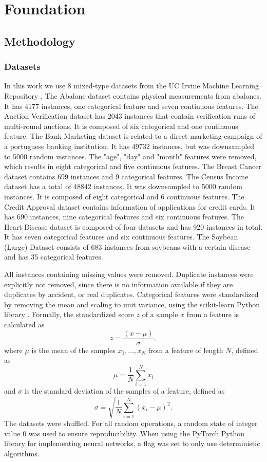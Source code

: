 \chapter{Foundation}

\section{Methodology}

\subsection{Datasets} \label{Datasets}

In this work we use 8 mixed-type datasets from the UC Irvine Machine Learning Repository \cite{uci_ml_rpo}.
The Abalone dataset \cite{abalone} contains physical measurements from abalones. It has 4177 instances, one categorical feature and seven continuous features.
The Auction Verification dataset \cite{auction_verification} has 2043 instances that contain verification runs of multi-round auctions. It is composed of six categorical and one continuous feature.
The Bank Marketing dataset \cite{bank_marketing} is related to a direct marketing campaign of a portuguese banking institution. It has 49732 instances, but was downsampled to 5000 random instances. The "age", "day" and "month" features were removed, which results in eight categorical and five continuous features.
The Breast Cancer dataset \cite{breast_cancer} contains 699 instances and 9 categorical features.
The Census Income dataset \cite{census_income} has a total of 48842 instances. It was downsampled to 5000 random instances. It is composed of eight categorical and 6 continuous features.
The Credit Approval dataset \cite{credit_approval} contains information of applications for credit cards. It has 690 instances, nine categorical features and six continuous features.
The Heart Disease dataset \cite{heart_disease} is composed of four datasets and has 920 instances in total. It has seven categorical features and six continuous features.
The Soybean (Large) Dataset \cite{abalone} consists of 683 instances from soybeans with a certain disease and has 35 categorical features.

All instances containing missing values were removed. Duplicate instances were explicitly not removed, since there is no information available if they are duplicates by accident, or real duplicates. Categorical features were standardized by removing the mean and scaling to unit variance, using the scikit-learn Python library \cite{scikit_learn}. Formally, the standardized score $z$ of a sample $x$ from a feature is calculated as
$$z = \frac{(x-\mu)}{\sigma},$$
where $\mu$ is the mean of the samples $x_1, ...,x_N$ from a feature of length $N$, defined as
$$\mu = \frac{1}{N} \sum^{N}_{i=1} x_i$$
and $\sigma$ is the standard deviation of the samples of a feature, defined as
$$\sigma = \sqrt{\frac{1}{N} \sum^{N}_{i=1}(x_i - \mu)^2}.$$
The datasets were shuffled. For all random operations, a random state of integer value 0 was used to ensure reproducibility. When using the PyTorch Python library \cite{pytorch} for implementing neural networks, a flag was set to only use deterministic algorithms.

